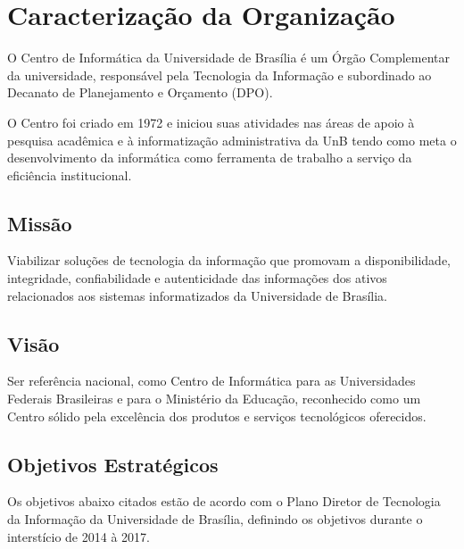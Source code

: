 \chapter[Caracterização da Organização]{Caracterização da Organização}

O Centro de Informática da Universidade de Brasília é um Órgão Complementar da universidade, responsável pela Tecnologia da Informação e subordinado ao Decanato de Planejamento e Orçamento (DPO).  

O Centro foi criado em 1972 e iniciou suas atividades nas áreas  de apoio à pesquisa acadêmica e à informatização administrativa 
da UnB tendo como meta o desenvolvimento da informática como ferramenta de trabalho a serviço da eficiência institucional.\cite{cpd2012relatorio} 

\section*{Missão}
Viabilizar soluções de tecnologia da informação que promovam a disponibilidade, integridade, confiabilidade e autenticidade das informações dos ativos relacionados aos sistemas informatizados da Universidade de Brasília.

\section*{Visão}
Ser referência nacional, como Centro de Informática para as Universidades Federais Brasileiras e para o Ministério da Educação, reconhecido como um Centro sólido pela excelência dos produtos e serviços tecnológicos oferecidos.

\section*{Objetivos Estratégicos}

Os objetivos abaixo citados estão de acordo com o Plano Diretor de Tecnologia da Informação da Universidade de Brasília\cite{unb2014-2017pdti}, definindo os objetivos durante o interstício de 2014 à 2017.

